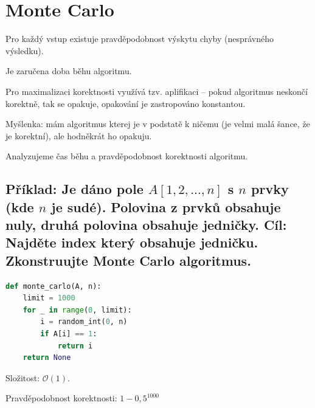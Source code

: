 \section{Monte Carlo}

\begin{compactitem}
    \item Pro každý vstup existuje pravděpodobnost výskytu chyby (nesprávného výsledku).

    \item Je zaručena doba běhu algoritmu.

    \item Pro maximalizaci korektnosti využívá tzv. aplifikaci -- pokud algoritmus neskončí korektně, tak se opakuje, opakování je zastropováno konstantou. \begin{compactitem}
        \item Myšlenka: mám algoritmus kterej je v podstatě k ničemu (je velmi malá šance, že je korektní), ale hodněkrát ho opakuju.
    \end{compactitem}

    \item Analyzujeme čas běhu a pravděpodobnost korektnosti algoritmu.
\end{compactitem}

\subsection{Příklad: Je dáno pole $A[1, 2, \dots, n]$ s $n$ prvky (kde $n$ je sudé). Polovina z prvků obsahuje nuly, druhá polovina obsahuje jedničky. Cíl: Najděte index který obsahuje jedničku. Zkonstruujte Monte Carlo algoritmus.}

\bigskip\noindent\begin{minipage}{\linewidth}
    \begin{lstlisting}[language=Python, caption={Monte Carlo algoritmus.}]
def monte_carlo(A, n):
    limit = 1000
    for _ in range(0, limit):
        i = random_int(0, n)
        if A[i] == 1:
            return i
    return None
\end{lstlisting}
\end{minipage}

\begin{compactitem}
    \item Složitost: $\mathcal{O}(1)$.
    \item Pravděpodobnost korektnosti: $1 - 0,5^{1000} $
\end{compactitem}

